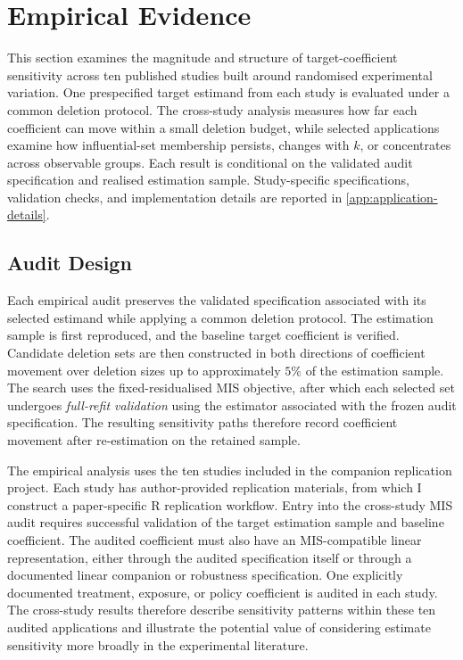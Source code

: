 \documentclass[../main.tex]{subfiles}
\begin{document}
\section{Empirical Evidence}
\label{sec:application}

This section examines the magnitude and structure of target-coefficient sensitivity across ten published studies built around randomised experimental variation. One prespecified target estimand from each study is evaluated under a common deletion protocol. The cross-study analysis measures how far each coefficient can move within a small deletion budget, while selected applications examine how influential-set membership persists, changes with \(k\), or concentrates across observable groups. Each result is conditional on the validated audit specification and realised estimation sample. Study-specific specifications, validation checks, and implementation details are reported in \autoref{app:application-details}.

\FloatBarrier
\subsection{Audit Design}
\label{subsec:application-design}

Each empirical audit preserves the validated specification associated with its selected estimand while applying a common deletion protocol. The estimation sample is first reproduced, and the baseline target coefficient is verified. Candidate deletion sets are then constructed in both directions of coefficient movement over deletion sizes up to approximately \(5\%\) of the estimation sample. The search uses the fixed-residualised MIS objective, after which each selected set undergoes \emph{full-refit validation} using the estimator associated with the frozen audit specification. The resulting sensitivity paths therefore record coefficient movement after re-estimation on the retained sample.

The empirical analysis uses the ten studies included in the companion replication project. Each study has author-provided replication materials, from which I construct a paper-specific R replication workflow. Entry into the cross-study MIS audit requires successful validation of the target estimation sample and baseline coefficient. The audited coefficient must also have an MIS-compatible linear representation, either through the audited specification itself or through a documented linear companion or robustness specification. One explicitly documented treatment, exposure, or policy coefficient is audited in each study. The cross-study results therefore describe sensitivity patterns within these ten audited applications and illustrate the potential value of considering estimate sensitivity more broadly in the experimental literature.
\end{document}
